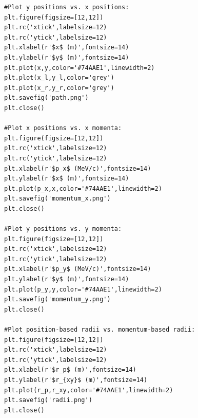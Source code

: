 \documentclass[letterpaper, 11pt]{article}
\begin{document}
\begin{lstlisting}
#Plot y positions vs. x positions:
plt.figure(figsize=[12,12])
plt.rc('xtick',labelsize=12)
plt.rc('ytick',labelsize=12)
plt.xlabel(r'$x$ (m)',fontsize=14)
plt.ylabel(r'$y$ (m)',fontsize=14)
plt.plot(x,y,color='#74AAE1',linewidth=2)
plt.plot(x_l,y_l,color='grey')
plt.plot(x_r,y_r,color='grey')
plt.savefig('path.png')
plt.close()

#Plot x positions vs. x momenta:
plt.figure(figsize=[12,12])
plt.rc('xtick',labelsize=12)
plt.rc('ytick',labelsize=12)
plt.xlabel(r'$p_x$ (MeV/c)',fontsize=14)
plt.ylabel(r'$x$ (m)',fontsize=14)
plt.plot(p_x,x,color='#74AAE1',linewidth=2)
plt.savefig('momentum_x.png')
plt.close()

#Plot y positions vs. y momenta:
plt.figure(figsize=[12,12])
plt.rc('xtick',labelsize=12)
plt.rc('ytick',labelsize=12)
plt.xlabel(r'$p_y$ (MeV/c)',fontsize=14)
plt.ylabel(r'$y$ (m)',fontsize=14)
plt.plot(p_y,y,color='#74AAE1',linewidth=2)
plt.savefig('momentum_y.png')
plt.close()

#Plot position-based radii vs. momentum-based radii:
plt.figure(figsize=[12,12])
plt.rc('xtick',labelsize=12)
plt.rc('ytick',labelsize=12)
plt.xlabel(r'$r_p$ (m)',fontsize=14)
plt.ylabel(r'$r_{xy}$ (m)',fontsize=14)
plt.plot(r_p,r_xy,color='#74AAE1',linewidth=2)
plt.savefig('radii.png')
plt.close()
\end{lstlisting}
\end{document}

